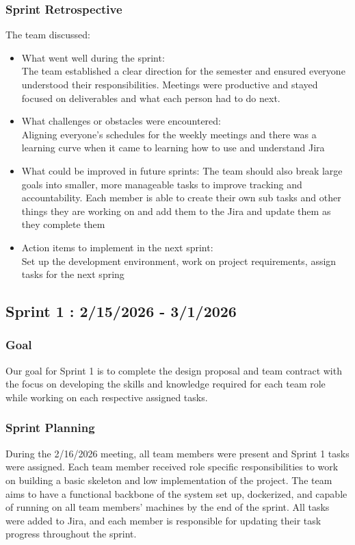 \documentclass{article}
\begin{document}
\subsubsection{Sprint Retrospective}
The team discussed:

\begin{itemize}
    \item What went well during the sprint: 
    \\The team established a clear direction for the semester and ensured everyone understood their responsibilities. Meetings were productive and stayed focused on deliverables and what each person had to do next.
    \item What challenges or obstacles were encountered:
    \\Aligning everyone’s schedules for the weekly meetings and there was a learning curve when it came to learning how to use and understand Jira

    \item What could be improved in future sprints:
    The team should also break large goals into smaller, more manageable tasks to improve tracking and accountability. Each member is able to create their own sub tasks and other things they are working on and add them to the Jira and update them as they complete them
    \item Action items to implement in the next sprint:
    \\Set up the development environment, work on project requirements, assign tasks for the next spring

\end{itemize}


\subsection{Sprint 1 : 2/15/2026 - 3/1/2026}
\subsubsection{Goal}
Our goal for Sprint 1 is to complete the design proposal and team contract with the focus on developing the skills and knowledge required for each team role while working on each respective assigned tasks.

\subsubsection{Sprint Planning}
During the 2/16/2026 meeting, all team members were present and Sprint 1 tasks were assigned. Each team member received role specific responsibilities to work on building a basic skeleton and low implementation of the project. The team aims to have a functional backbone of the system set up, dockerized, and capable of running on all team members' machines by the end of the sprint. All tasks were added to Jira, and each member is responsible for updating their task progress throughout the sprint.
\end{document}
